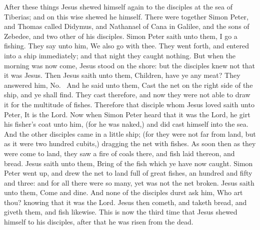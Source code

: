  After these things Jesus shewed himself again to the
disciples at the sea of Tiberias; and on this wise shewed he himself.
 There were together Simon Peter, and Thomas called Didymus,
and Nathanael of Cana in Galilee, and the sons of Zebedee, and two other
of his disciples.  Simon Peter saith unto them, I go a
fishing. They say unto him, We also go with thee. They went forth, and
entered into a ship immediately; and that night they caught nothing.
 But when the morning was now come, Jesus stood on the
shore: but the disciples knew not that it was Jesus.  Then
Jesus saith unto them, Children, have ye any meat? They answered him,
No.~ And he said unto them, Cast the net on the right side
of the ship, and ye shall find. They cast therefore, and now they were
not able to draw it for the multitude of fishes.  Therefore
that disciple whom Jesus loved saith unto Peter, It is the Lord. Now
when Simon Peter heard that it was the Lord, he girt his fisher's coat
unto him, (for he was naked,) and did cast himself into the sea.
 And the other disciples came in a little ship; (for they
were not far from land, but as it were two hundred cubits,) dragging the
net with fishes.  As soon then as they were come to land,
they saw a fire of coals there, and fish laid thereon, and bread.
 Jesus saith unto them, Bring of the fish which ye have now
caught.  Simon Peter went up, and drew the net to land full
of great fishes, an hundred and fifty and three: and for all there were
so many, yet was not the net broken.  Jesus saith unto
them, Come and dine. And none of the disciples durst ask him, Who art
thou? knowing that it was the Lord.  Jesus then cometh, and
taketh bread, and giveth them, and fish likewise.  This is
now the third time that Jesus shewed himself to his disciples, after
that he was risen from the dead.


